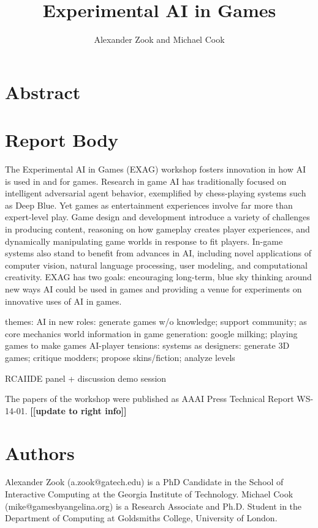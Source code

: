 \documentclass[10pt,a4paper]{article}
\author{Alexander Zook and Michael Cook}
\title{Experimental AI in Games}
\date{}
\newcommand{\mytodo}[1]{\textbf{[[#1]]}}
\begin{document}
\maketitle

\section*{Abstract}



\section*{Report Body}

The Experimental AI in Games (EXAG) workshop fosters innovation in how AI is used in and for games.
Research in game AI has traditionally focused on intelligent adversarial agent behavior, exemplified by chess-playing systems such as Deep Blue.
Yet games as entertainment experiences involve far more than expert-level play.
Game design and development introduce a variety of challenges in producing content, reasoning on how gameplay creates player experiences, and dynamically manipulating game worlds in response to fit players.
In-game systems also stand to benefit from advances in AI, including novel applications of computer vision, natural language processing, user modeling, and computational creativity.
EXAG has two goals: encouraging long-term, blue sky thinking around new ways AI could be used in games and providing a venue for experiments on innovative uses of AI in games.



themes:
AI in new roles: generate games w/o knowledge; support community; as core mechanics
world information in game generation: google milking; playing games to make games
AI-player tensions: 
systems as designers: generate 3D games; critique modders; propose skins/fiction; analyze levels



RCAIIDE panel + discussion
demo session

The papers of the workshop were published as AAAI Press Technical Report WS-14-01.
\mytodo{update to right info}


\section*{Authors}
Alexander Zook (a.zook@gatech.edu) is a PhD Candidate in the School of Interactive Computing at the Georgia Institute of Technology.
Michael Cook (mike@gamesbyangelina.org) is a Research Associate and Ph.D. Student in the Department of Computing at Goldsmiths College, University of London.
\end{document}
